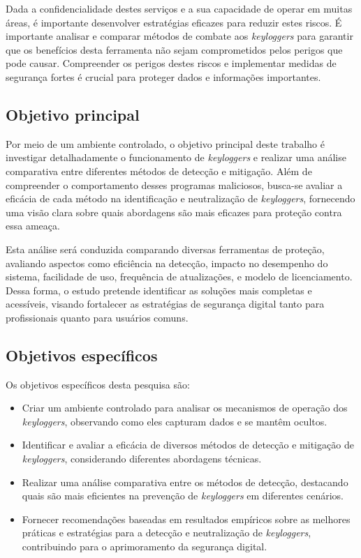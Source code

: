 \documentclass[12pt]{article}
\begin{document}
Dada a confidencialidade destes serviços e a sua capacidade de operar em muitas áreas, é importante desenvolver estratégias eficazes para reduzir estes riscos. É importante analisar e comparar métodos de combate aos \textit{keyloggers} para garantir que os benefícios desta ferramenta não sejam comprometidos pelos perigos que pode causar. Compreender os perigos destes riscos e implementar medidas de segurança fortes é crucial para proteger dados e informações importantes.

\subsection{Objetivo principal}
Por meio de um ambiente controlado, o objetivo principal deste trabalho é investigar detalhadamente o funcionamento de \textit{keyloggers} e realizar uma análise comparativa entre diferentes métodos de detecção e mitigação. Além de compreender o comportamento desses programas maliciosos, busca-se avaliar  a eficácia de cada método na identificação e neutralização de \textit{keyloggers}, fornecendo uma visão clara sobre quais abordagens são mais eficazes para proteção contra essa ameaça.

Esta análise será conduzida comparando diversas ferramentas de proteção, avaliando aspectos como eficiência na detecção, impacto no desempenho do sistema, facilidade de uso, frequência de atualizações, e modelo de licenciamento. Dessa forma, o estudo pretende identificar as soluções mais completas e acessíveis, visando fortalecer as estratégias de segurança digital tanto para profissionais quanto para usuários comuns.

\subsection{Objetivos específicos}

Os objetivos específicos desta pesquisa são:
\begin{itemize}
    \item Criar um ambiente controlado para analisar os mecanismos de operação dos \textit{keyloggers}, observando como eles capturam dados e se mantêm ocultos.
    \item Identificar e avaliar a eficácia de diversos métodos de detecção e mitigação de \textit{keyloggers}, considerando diferentes abordagens técnicas.
    \item Realizar uma análise comparativa entre os métodos de detecção, destacando quais são mais eficientes na prevenção de \textit{keyloggers} em diferentes cenários.
    \item Fornecer recomendações baseadas em resultados empíricos sobre as melhores práticas e estratégias para a detecção e neutralização de \textit{keyloggers}, contribuindo para o aprimoramento da segurança digital.
\end{itemize}
\end{document}
